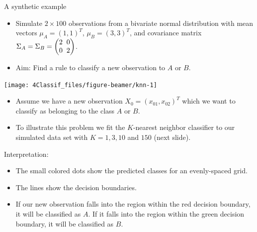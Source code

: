 \documentclass[10pt,ignorenonframetext,]{beamer}
\providecommand{\tightlist}{%
  \setlength{\itemsep}{0pt}\setlength{\parskip}{0pt}}
\begin{document}
\begin{frame}

\begin{block}{A synthetic example}

\begin{itemize}
\item
  Simulate \(2\times 100\) observations from a bivariate normal
  distribution with mean vectors \(\mu_A = (1, 1)^T\),
  \(\mu_B = (3, 3)^T\), and covariance matrix
  \(\Sigma_A = \Sigma_B = \begin{pmatrix} 2\hspace{2mm} 0 \\ 0 \hspace{2mm} 2 \end{pmatrix}\).
\item
  Aim: Find a rule to classify a new observation to \(A\) or \(B\).
\end{itemize}

\begin{center}\texttt{[image: 4Classif\_files/figure-beamer/knn-1]} \end{center}

\end{block}

\end{frame}

\begin{frame}

\begin{itemize}
\tightlist
\item
  Assume we have a new observation \(X_0 = (x_{01}, x_{02})^T\) which we
  want to classify as belonging to the class \(A\) or \(B\).
\item
  To illustrate this problem we fit the \(K\)-nearest neighbor
  classifier to our simulated data set with \(K = 1, 3, 10\) and \(150\)
  (next slide).
\end{itemize}

\vspace{4mm}

Interpretation:

\begin{itemize}
\tightlist
\item
  The small colored dots show the predicted classes for an evenly-spaced
  grid.
\item
  The lines show the decision boundaries.
\item
  If our new observation falls into the region within the red decision
  boundary, it will be classified as \(A\). If it falls into the region
  within the green decision boundary, it will be classified as \(B\).
\end{itemize}

\end{frame}
\end{document}
